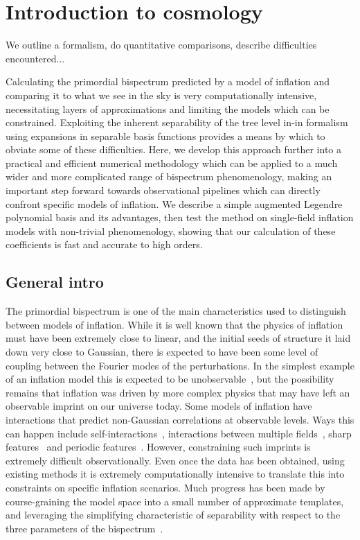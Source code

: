 %
\chapter{Introduction to cosmology}\label{chapter:intro_general}
We outline a formalism, do quantitative comparisons, describe difficulties encountered$\ldots$

Calculating the primordial bispectrum predicted by a model of inflation and
comparing it to what we see in the sky is very computationally intensive, necessitating layers
of approximations and limiting the models which can be constrained.  Exploiting the inherent separability
of the tree level in-in formalism using expansions in separable basis functions provides a means by which to
obviate some of these difficulties. Here, we develop this approach further into a practical and efficient
numerical methodology which can be applied to a much wider and more complicated range of bispectrum
phenomenology, making an important step forward towards observational pipelines which can directly
confront specific models of inflation.  We describe a simple augmented Legendre polynomial basis
and its advantages, then test the method on single-field inflation models with non-trivial phenomenology,
showing that our calculation of these coefficients is fast and accurate to high orders.

\section{General intro}\label{sec:general_intro}
The primordial bispectrum is one of the main
characteristics used to distinguish between models of inflation. While it is well
known that the physics of inflation must have been extremely close
to linear, and the initial seeds of structure it laid down
very close to Gaussian, there is expected to have been some level of coupling
between the Fourier modes of the perturbations.
In the simplest example of an inflation model this is
expected to be unobservable~\cite{Maldacena},
but the possibility remains that inflation was driven by
more complex physics that may have left an observable imprint on our universe today.
Some models of inflation have interactions that predict non-Gaussian
correlations at observable levels. Ways this can happen include
self-interactions~\cite{px_burrage,dbi_in_the_sky},
interactions between multiple fields~\cite{Byrnes_2010},
sharp features~\cite{adshead}
and periodic features~\cite{flauger_pajer_resonant}.
However, constraining such imprints is extremely difficult observationally.
Even once the data has been obtained, using existing methods it is
extremely computationally intensive to translate this into constraints
on specific inflation scenarios. Much progress has been made by course-graining
the model space into a small number of approximate templates,
and leveraging the simplifying characteristic of separability
with respect to the three parameters of the bispectrum~\cite{Komatsu_2005, Munchmeyer_2014}.


